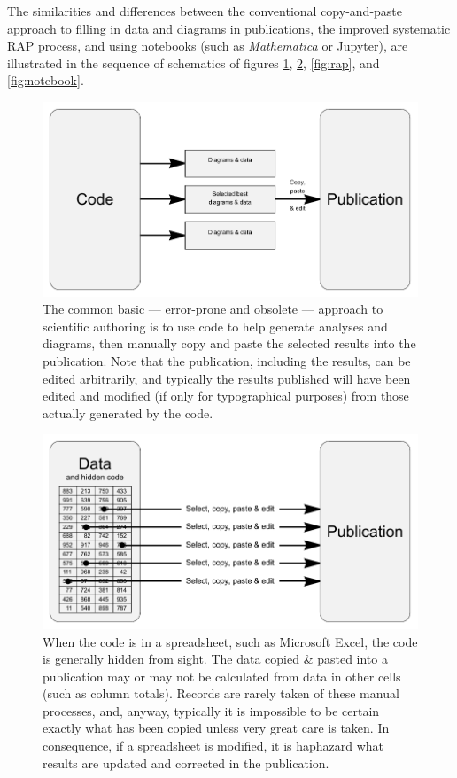 \documentclass[10pt,a4paper]{article}
\begin{document}


The similarities and differences between the conventional copy-and-paste approach to filling in data and diagrams in publications, the improved systematic RAP process, and using notebooks (such as \emph{Mathematica\/} or Jupyter), are illustrated in the sequence of schematics of figures \ref{fig:basic}, \ref{fig:excel}, \ref{fig:rap}, and \ref{fig:notebook}.

\begin{figure} 
   \centering
   \includegraphics[width=5in]{generated/basic.pdf} 
   \caption{The common basic --- error-prone and obsolete --- approach to scientific authoring is to use code to help generate analyses and diagrams, then manually copy and paste the selected results into the publication. Note that the publication, including the results, can be edited arbitrarily, and typically the results published will have been edited and modified (if only for typographical purposes) from those actually generated by the code.}
   \label{fig:basic}
\end{figure}
\begin{figure} 
   \centering
   \includegraphics[width=5in]{generated/excel.pdf} 
   \caption{When the code is in a spreadsheet, such as Microsoft Excel, the code is generally hidden from sight. The data copied \& pasted into a publication may or may not be calculated from data in other cells (such as column totals). Records are rarely taken of these manual processes, and, anyway, typically it is impossible to be certain exactly what has been copied unless very great care is taken. In consequence, if a spreadsheet is modified, it is haphazard what results are updated and corrected in the publication. }
   \label{fig:excel}
\end{figure}
\end{document}
